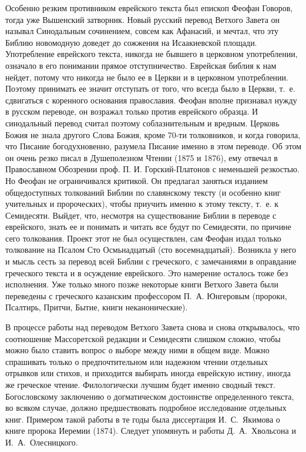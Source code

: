 Особенно резким противником еврейского текста был епископ Феофан
Говоров, тогда уже Вышенский затворник.
Новый русский перевод Ветхого Завета он называл Синодальным сочинением,
совсем как Афанасий, и мечтал, что эту Библию новомодную доведет до
сожжения на Исаакиевской площади.
Употребление еврейского текста, никогда не бывшего в церковном
употреблении, означало в его понимании прямое отступничество.
Еврейская библия к нам нейдет, потому что никогда не было ее в Церкви и
в церковном употреблении.
Поэтому принимать ее значит отступать от того, что всегда было в Церкви,
т.~е. сдвигаться с коренного основания православия.
Феофан вполне признавал нужду в русском переводе, он возражал только
против еврейского образца.
И синодальный перевод считал поэтому соблазнительным и вредным.
Церковь Божия не знала другого Слова Божия, кроме 70-ти толковников, и
когда говорила, что Писание богодухновенно, разумела Писание именно в
этом переводе.
Об этом он очень резко писал в Душеполезном Чтении (1875 и 1876),
ему отвечал в Православном Обозрении проф. П. И. Горский-Платонов с
неменьшей резкостью.
Но Феофан не ограничивался критикой.
Он предлагал заняться изданием общедоступных толкований Библии по
славянскому тексту (и особенно книг учительных и пророческих),
чтобы приучить именно к этому тексту, т.~е. к Семидесяти.
Выйдет, что, несмотря на существование Библии в переводе с
еврейского, знать ее и понимать и читать все будут по
Семидесяти, по причине сего толкования.
Проект этот не был осуществлен, сам Феофан издал только
толкование на Псалом Сто Осмьнадцатый (сто восемнадцатый).
Возникла у него и мысль сесть за перевод всей Библии с греческого,
с замечаниями в оправдание греческого текста и в осуждение
еврейского.
Это намерение осталось тоже без исполнения.
Уже только много позже некоторые книги Ветхого Завета были переведены с
греческого казанским профессором П.~А. Юнгеровым (пророки, Псалтирь,
Притчи, Бытие, книги неканонические).

В процессе работы над переводом Ветхого Завета снова и снова
открывалось, что соотношение Массоретской редакции и Семидесяти слишком
сложно, чтобы можно было ставить вопрос о выборе между ними в общем
виде.
Можно спрашивать только о предпочтительном или надежном чтении
отдельных отрывков или стихов, и приходится выбирать иногда еврейскую
истину, иногда же греческое чтение.
Филологически лучшим будет именно сводный текст.
Богословскому заключению о догматическом достоинстве определенного
текста, во всяком случае, должно предшествовать подробное исследование
отдельных книг.
Примером такой работы в те годы была диссертация И.~С.~Якимова о книге
пророка Иеремии (1874).
Следует упомянуть и работы Д.~А.~Хвольсона и И.~А.~Олесницкого.  

